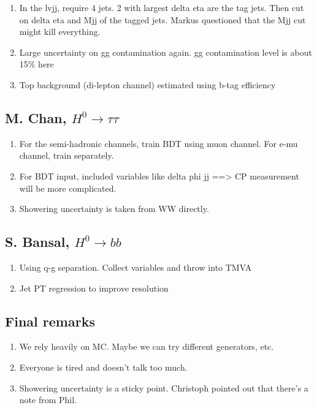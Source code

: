 \documentclass{fheadnote}
\begin{document}
\begin{enumerate}
\item In the lvjj, require 4 jets.  2 with largest delta eta are the tag jets.  Then cut on delta eta and
   Mjj of the tagged jets.  Markus questioned that the Mjj cut might kill everything.
\item Large uncertainty on gg contamination again.  gg contamination level is about 15\% here
\item Top background (di-lepton channel) estimated using b-tag efficiency
\end{enumerate}

\subsection{M. Chan, $H^0 \rightarrow \tau\tau$}

\begin{enumerate}
\item For the semi-hadronic channels, train BDT using muon channel.  For e-mu channel, train separately.
\item For BDT input, included variables like delta phi jj ==> CP measurement will be more complicated.
\item Showering uncertainty is taken from WW directly.
\end{enumerate}

\subsection{S. Bansal, $H^0 \rightarrow bb$}

\begin{enumerate}
\item Using q-g separation.  Collect variables and throw into TMVA
\item Jet PT regression to improve resolution
\end{enumerate}

\subsection{Final remarks}

\begin{enumerate}
\item We rely heavily on MC.  Maybe we can try different generators, etc.
\item Everyone is tired and doesn't talk too much.
\item Showering uncertainty is a sticky point.  Christoph pointed out that there's a note from Phil.
\end{enumerate}


\pagebreak
\end{document}
